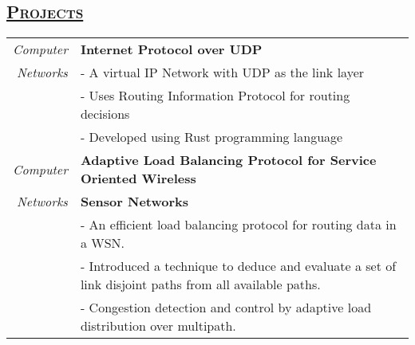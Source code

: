 \documentclass[14pt]{article}
\begin{document}
\subsection* {\scshape\large\uline {Projects}}
\begin{tabularx}{\textwidth}{r X}
\emph{Computer} & \textbf{Internet Protocol over UDP} \\
\emph{Networks} & - A virtual IP Network with UDP as the link layer\\
                             & - Uses Routing Information Protocol for routing decisions\\
                             & - Developed using Rust programming language\\

\emph{Computer} & \textbf{Adaptive Load Balancing Protocol for Service Oriented Wireless} \\
\emph{Networks} & \textbf{Sensor Networks} \\
                             & - An efficient load balancing protocol for routing data in a WSN.\\
                             & - Introduced a technique to deduce and evaluate a set of link disjoint paths from all available paths.\\
                             & - Congestion detection and control by adaptive load distribution over multipath.
\\
\end{tabularx}
\end{document}
